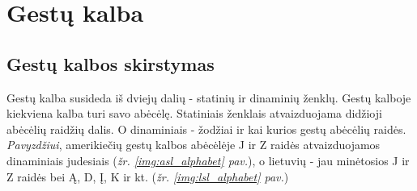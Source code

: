 \documentclass{VUMIFInfKursinis}
\begin{document}
\section{Gestų kalba}
\subsection{Gestų kalbos skirstymas}
Gestų kalba susideda iš dviejų dalių - statinių ir dinaminių ženklų. Gestų kalboje kiekviena kalba turi savo abėcėlę. Statiniais ženklais atvaizduojama didžioji abėcėlių raidžių dalis. O dinaminiais - žodžiai ir kai kurios gestų abėcėlių raidės. \textit{Pavyzdžiui}, amerikiečių gestų kalbos abėcėlėje J ir Z raidės atvaizduojamos dinaminiais judesiais (\textit{žr. \ref{img:asl_alphabet} pav.}), o lietuvių - jau minėtosios J ir Z raidės bei Ą, D, Į, K ir kt. (\textit{žr. \ref{img:lsl_alphabet} pav.})
\end{document}

